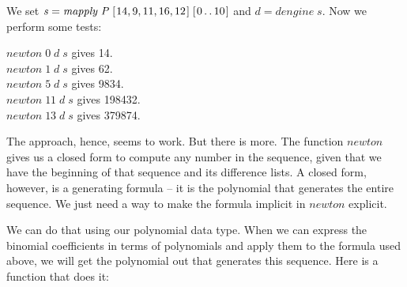 \documentclass[tikz]{scrreprt}
\newcommand{\Conid}[1]{\mathit{#1}}
\newcommand{\Varid}[1]{\mathit{#1}}
\begin{document}
We set \ensuremath{\Varid{s}\mathrel{=}\Varid{mapply}\;\Conid{P}\;[\mskip1.5mu \mathrm{14},\mathrm{9},\mathrm{11},\mathrm{16},\mathrm{12}\mskip1.5mu]\;[\mskip1.5mu \mathrm{0}\mathinner{\ldotp\ldotp}\mathrm{10}\mskip1.5mu]} and \ensuremath{\Varid{d}\mathrel{=}\Varid{dengine}\;\Varid{s}}.
Now we perform some tests:

\begin{minipage}{\textwidth}
\ensuremath{\Varid{newton}\;\mathrm{0}\;\Varid{d}\;\Varid{s}} gives      14.\\
\ensuremath{\Varid{newton}\;\mathrm{1}\;\Varid{d}\;\Varid{s}} gives      62.\\
\ensuremath{\Varid{newton}\;\mathrm{5}\;\Varid{d}\;\Varid{s}} gives    9834.\\
\ensuremath{\Varid{newton}\;\mathrm{11}\;\Varid{d}\;\Varid{s}} gives  198432.\\
\ensuremath{\Varid{newton}\;\mathrm{13}\;\Varid{d}\;\Varid{s}} gives  379874.
\end{minipage}

The approach, hence, seems to work.
But there is more.
The function \ensuremath{\Varid{newton}} gives us a closed form 
to compute any number in the sequence,
given that we have the beginning of that sequence
and its difference lists.
A closed form, however, is a generating formula --
it is the polynomial that generates the entire sequence.
We just need a way to make the formula implicit in
\ensuremath{\Varid{newton}} explicit.

We can do that using our polynomial data type.
When we can express the binomial coefficients
in terms of polynomials and apply them
to the formula used above, we will get the polynomial out
that generates this sequence.
Here is a function that does it:
\end{document}
